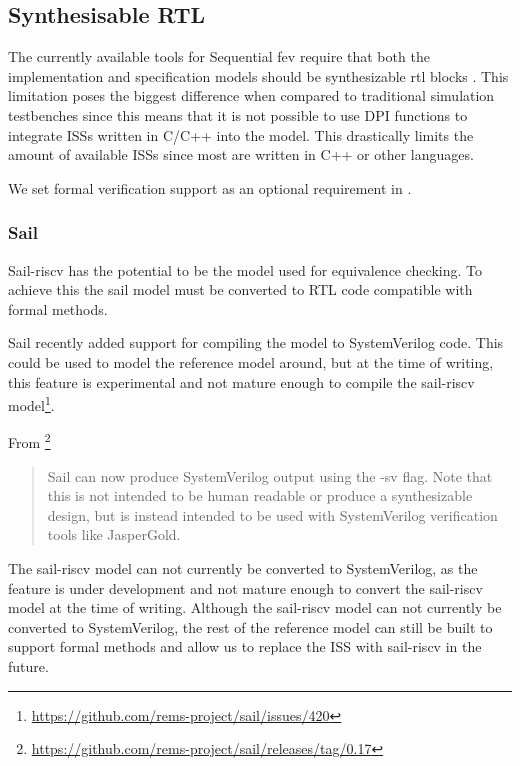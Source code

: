 \subsection{Synthesisable RTL}

The currently available tools for Sequential \acrshort{fev} require that both the implementation and specification models should be synthesizable \acrshort{rtl} blocks \cite{seligmanFormalVerificationEssential2015}. This limitation poses the biggest difference when compared to traditional simulation testbenches since this means that it is not possible to use DPI functions \cite{} to integrate ISSs written in C/C++ into the model. This drastically limits the amount of available ISSs since most are written in C++ or other languages. 

We set formal verification support as an optional requirement in .

\subsubsection{Sail}

Sail-riscv has the potential to be the model used for equivalence checking.
To achieve this the sail model must be converted to RTL code compatible with formal methods.


Sail recently added support for compiling the model to SystemVerilog code. This could be used to model the reference model around, but at the time of writing, this feature is experimental and not mature enough to compile the sail-riscv model\footnote{\url{https://github.com/rems-project/sail/issues/420}}.

From \footnote{\url{https://github.com/rems-project/sail/releases/tag/0.17}}

\begin{quote}
    
Sail can now produce SystemVerilog output using the -sv flag. Note
that this is not intended to be human readable or produce a
synthesizable design, but is instead intended to be used with
SystemVerilog verification tools like JasperGold.
\end{quote}

The sail-riscv model can not currently be converted to SystemVerilog, as the feature is under development and not mature enough to convert the sail-riscv model at the time of writing.\cite{}
Although the sail-riscv model can not currently be converted to SystemVerilog, the rest of the reference model can still be built to support formal methods and allow us to replace the ISS with sail-riscv in the future.

